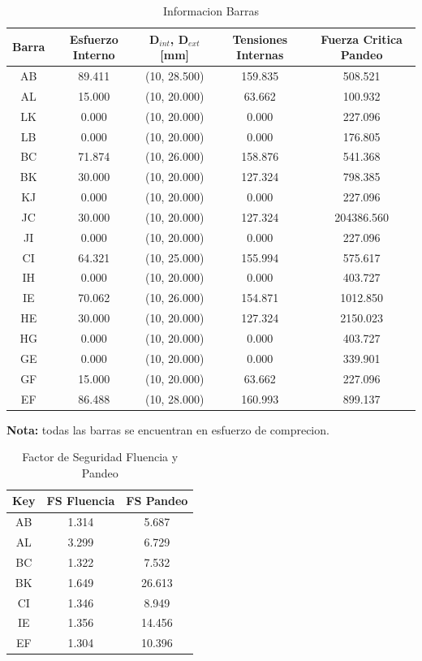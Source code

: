 \begin{table}[H]
    \centering
    \begin{tabular}{|c|c|c|c|c|}
    \hline
    \textbf{Barra} & \textbf{Esfuerzo Interno} & \textbf{D$_{int}$, D$_{ext}$ [mm]} & \textbf{Tensiones Internas} & \textbf{Fuerza Critica Pandeo} \\ 
    \hline
    AB & 89.411 & (10, 28.500) & 159.835 & 508.521 \\ 
    AL & 15.000 & (10, 20.000) & 63.662 & 100.932 \\ 
    LK & 0.000 & (10, 20.000) & 0.000 & 227.096 \\ 
    LB & 0.000 & (10, 20.000) & 0.000 & 176.805 \\ 
    BC & 71.874 & (10, 26.000) & 158.876 & 541.368 \\ 
    BK & 30.000 & (10, 20.000) & 127.324 & 798.385 \\ 
    KJ & 0.000 & (10, 20.000) & 0.000 & 227.096 \\ 
    JC & 30.000 & (10, 20.000) & 127.324 & 204386.560 \\ 
    JI & 0.000 & (10, 20.000) & 0.000 & 227.096 \\ 
    CI & 64.321 & (10, 25.000) & 155.994 & 575.617 \\ 
    IH & 0.000 & (10, 20.000) & 0.000 & 403.727 \\ 
    IE & 70.062 & (10, 26.000) & 154.871 & 1012.850 \\ 
    HE & 30.000 & (10, 20.000) & 127.324 & 2150.023 \\ 
    HG & 0.000 & (10, 20.000) & 0.000 & 403.727 \\ 
    GE & 0.000 & (10, 20.000) & 0.000 & 339.901 \\ 
    GF & 15.000 & (10, 20.000) & 63.662 & 227.096 \\ 
    EF & 86.488 & (10, 28.000) & 160.993 & 899.137 \\ 
    \hline
    \end{tabular}
    \caption{Informacion Barras}
\end{table}

\textbf{Nota:} todas las barras se encuentran en esfuerzo de comprecion.

\begin{table}[H]
\centering
\begin{tabular}{|c|c|c|}
\hline
\textbf{Key} & \textbf{FS Fluencia} & \textbf{FS Pandeo} \\ 
\hline
AB & 1.314 & 5.687 \\ 
AL & 3.299 & 6.729 \\ 
BC & 1.322 & 7.532 \\ 
BK & 1.649 & 26.613 \\ 
CI & 1.346 & 8.949 \\ 
IE & 1.356 & 14.456 \\ 
EF & 1.304 & 10.396 \\ 
\hline
\end{tabular}
\caption{Factor de Seguridad Fluencia y Pandeo}
\end{table}

